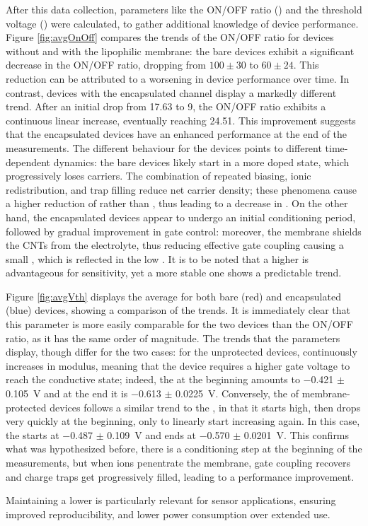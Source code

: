 After this data collection, parameters like the ON/OFF ratio (\ratio{}) and the
threshold voltage (\vth{}) were calculated, to gather additional knowledge of
device performance. Figure \ref{fig:avgOnOff} compares the trends of the ON/OFF
ratio for devices without and with the lipophilic membrane: the bare devices
exhibit a significant decrease in the ON/OFF ratio, dropping from $100 \pm 30$
to $60 \pm 24$. This reduction can be attributed to a worsening in device
performance over time. In contrast, devices with the encapsulated channel
display a markedly different trend. After an initial drop from 17.63 to 9, the
ON/OFF ratio exhibits a continuous linear increase, eventually reaching 24.51.
This improvement suggests that the encapsulated devices have an enhanced
performance at the end of the measurements. The different behaviour for the
devices points to different time-dependent dynamics: the bare devices likely
start in a more doped state, which progressively loses carriers. The combination
of repeated biasing, ionic redistribution, and trap filling reduce net carrier
density; these phenomena cause a higher reduction of \ion{} rather than \ioff{},
thus leading to a decrease in \ratio{}. On the other hand, the encapsulated
devices appear to undergo an initial conditioning period, followed by gradual
improvement in gate control: moreover, the membrane shields the CNTs from the
electrolyte, thus reducing effective gate coupling causing a small \ion{}, which
is reflected in the low \ratio{}. It is to be noted that a higher \ratio{} is
advantageous for sensitivity, yet a more stable one shows a predictable trend.

Figure \ref{fig:avgVth} displays the average \vth{} for both bare (red) and encapsulated (blue) devices, showing a comparison of the trends. It is immediately clear that this parameter is more easily comparable for the two devices than the ON/OFF ratio, as it has the same order of magnitude. The trends that the parameters display, though differ for the two cases: for the unprotected devices, \vth{} continuously increases in modulus, meaning that the device requires a higher gate voltage to reach the conductive state; indeed, the \vth{} at the beginning amounts to \SI{-0.421}{} $\pm$ \SI{0.105}{\V} and at the end it is \SI{-0.613}{} $\pm$ \SI{0.0225}{\V}.
Conversely, the \vth{} of membrane-protected devices
follows a similar trend to the \ion{}, in that it starts high, then drops very quickly at the beginning, only to linearly start increasing again. In this case, the \vth{} starts at \SI{-0.487}{} $\pm$ \SI{0.109}{\V} and ends at \SI{-0.570}{} $\pm$ \SI{0.0201}{\V}. This confirms what was hypothesized before, \ie{} there is a conditioning step at the beginning of the measurements, but when ions penentrate the membrane, gate coupling recovers and charge traps get progressively filled, leading to a performance improvement. 

Maintaining a lower \vth{} is particularly relevant for sensor applications, ensuring improved reproducibility, and lower power consumption over extended use. 